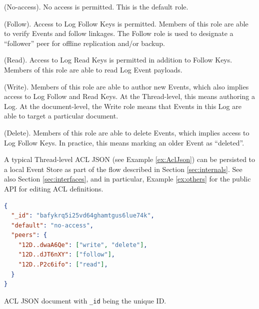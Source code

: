 \documentclass{textile}
\begin{document}
\begin{definition}
(No-access). No access is permitted. This is the default role.
\end{definition}

\begin{definition}
(Follow). Access to Log Follow Keys is permitted. Members of this role are able to verify Events and follow linkages. The Follow role is used to designate a ``follower'' peer for offline replication and/or backup.
\end{definition}

\begin{definition}
(Read). Access to Log Read Keys is permitted in addition to Follow Keys. Members of this role are able to read Log Event payloads.
\end{definition}

\begin{definition}
(Write). Members of this role are able to author new Events, which also implies access to Log Follow and Read Keys. At the Thread-level, this means authoring a Log. At the document-level, the Write role means that Events in this Log are able to target a particular document.
\end{definition}

\begin{definition}
(Delete). Members of this role are able to delete Events, which implies access to Log Follow Keys. In practice, this means marking an older Event as ``deleted''.
\end{definition}

A typical Thread-level ACL JSON (see Example \ref{ex:AclJson}) can be persisted to a local Event Store as part of the flow described in Section \ref{sec:internals}. See also Section \ref{sec:interfaces}, and in particular, Example \ref{ex:others} for the public API for editing ACL definitions.

\begin{example}
\begin{minipage}{.45\textwidth}
\begin{lstlisting}[language=json,firstnumber=1]
{
  "_id": "bafykrq5i25vd64ghamtgus6lue74k",
  "default": "no-access",
  "peers": {
    "12D..dwaA6Qe": ["write", "delete"],
    "12D..dJT6nXY": ["follow"],
    "12D..P2c6ifo": ["read"],
  }
}
\end{lstlisting}
\caption{ACL JSON document with \texttt{\_id} being the unique ID. }
 \label{ex:AclJson}
\end{minipage}
\end{example}
\end{document}
